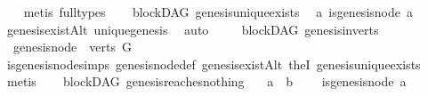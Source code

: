 \begin{isabellebody}
\ \ \isamarkupfalse%
\ {\isacharparenleft}{\kern0pt}metis\ {\isacharparenleft}{\kern0pt}full{\isacharunderscore}{\kern0pt}types{\isacharparenright}{\kern0pt}{\isacharparenright}{\kern0pt}%
\endisatagproof
{\isafoldproof}%
%
\isadelimproof
\ \isanewline
%
\endisadelimproof
\isanewline
{}\isamarkupfalse%
\ {\isacharparenleft}{\kern0pt}\ blockDAG{\isacharparenright}{\kern0pt}\ genesis{\isacharunderscore}{\kern0pt}unique{\isacharunderscore}{\kern0pt}exists{\isacharcolon}{\kern0pt}\isanewline
\ \ {\isachardoublequoteopen}{\isasymexists}{\isacharbang}{\kern0pt}a{\isachardot}{\kern0pt}\ is{\isacharunderscore}{\kern0pt}genesis{\isacharunderscore}{\kern0pt}node\ a{\isachardoublequoteclose}\isanewline
%
\isadelimproof
\ \ %
\endisadelimproof
%
\isatagproof
{}\isamarkupfalse%
\ genesis{\isacharunderscore}{\kern0pt}existAlt\ unique{\isacharunderscore}{\kern0pt}genesis\ \isamarkupfalse%
\ auto%
\endisatagproof
{\isafoldproof}%
%
\isadelimproof
\ \ \isanewline
%
\endisadelimproof
\isanewline
{}\isamarkupfalse%
\ {\isacharparenleft}{\kern0pt}\ blockDAG{\isacharparenright}{\kern0pt}\ genesis{\isacharunderscore}{\kern0pt}in{\isacharunderscore}{\kern0pt}verts{\isacharcolon}{\kern0pt}\isanewline
\ \ {\isachardoublequoteopen}genesis{\isacharunderscore}{\kern0pt}node\ {\isasymin}\ verts\ G{\isachardoublequoteclose}\isanewline
%
\isadelimproof
\ \ %
\endisadelimproof
%
\isatagproof
{}\isamarkupfalse%
\ is{\isacharunderscore}{\kern0pt}genesis{\isacharunderscore}{\kern0pt}node{\isachardot}{\kern0pt}simps\ genesis{\isacharunderscore}{\kern0pt}node{\isacharunderscore}{\kern0pt}def\ genesis{\isacharunderscore}{\kern0pt}existAlt\ the{}I{}\ genesis{\isacharunderscore}{\kern0pt}unique{\isacharunderscore}{\kern0pt}exists\isanewline
\ \ \isamarkupfalse%
\ metis%
\endisatagproof
{\isafoldproof}%
%
\isadelimproof
\ \isanewline
%
\endisadelimproof
\isanewline
{}\isamarkupfalse%
\ {\isacharparenleft}{\kern0pt}\ blockDAG{\isacharparenright}{\kern0pt}\ genesis{\isacharunderscore}{\kern0pt}reaches{\isacharunderscore}{\kern0pt}nothing{\isacharcolon}{\kern0pt}\isanewline
\ \ \ {\isachardoublequoteopen}a\ {\isasymrightarrow}\isactrlsup {\isacharplus}{\kern0pt}\ b{\isachardoublequoteclose}\isanewline
\ \ \ {\isachardoublequoteopen}{\isasymnot}\ is{\isacharunderscore}{\kern0pt}genesis{\isacharunderscore}{\kern0pt}node\ a{\isachardoublequoteclose}\isanewline
%
\isadelimproof

\end{isabellebody}
